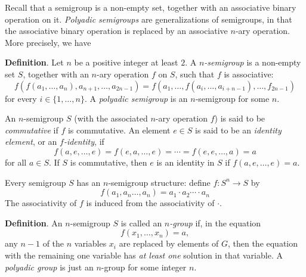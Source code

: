 \documentclass[12pt]{article}
\begin{document}
Recall that a semigroup is a non-empty set, together with an associative binary operation on it.  \emph{Polyadic semigroups} are generalizations of semigroups, in that the associative binary operation is replaced by an associative $n$-ary operation.  More precisely, we have

\textbf{Definition}.  Let $n$ be a positive integer at least $2$.  A \emph{$n$-semigroup} is a non-empty set $S$, together with an $n$-ary operation $f$ on $S$, such that $f$ is associative:
$$f(f(a_1,\ldots, a_n),a_{n+1},\ldots, a_{2n-1})=f(a_1,\ldots, f(a_i,\ldots, a_{i+n-1}), \ldots, f_{2n-1})$$
for every $i\in \lbrace 1,\ldots, n\rbrace$.  A \emph{polyadic semigroup} is an $n$-semigroup for some $n$.

An $n$-semigroup $S$ (with the associated $n$-ary operation $f$) is said to be \emph{commutative} if $f$ is commutative.  An element $e\in S$ is said to be an \emph{identity element}, or an \emph{$f$-identity}, if $$f(a, e, \ldots, e)=f(e,a,\ldots,e)=\cdots = f(e,e,\ldots,a) = a$$ for all $a\in S$.  If $S$ is commutative, then $e$ is an identity in $S$ if $f(a,e,\ldots,e)=a$.

Every semigroup $S$ has an $n$-semigroup structure: define $f:S^n\to S$ by 
\begin{equation}
f(a_1,a_n\ldots,a_n)=a_1 \cdot a_2 \cdots \cdot a_n
\end{equation}
The associativity of $f$ is induced from the associativity of $\cdot$. 

\textbf{Definition}.  An $n$-semigroup $S$ is called an \emph{$n$-group} if, in the equation 
\begin{equation}
f(x_1,\ldots, x_n)=a,
\end{equation}
any $n-1$ of the $n$ variables $x_i$ are replaced by elements of $G$, then the equation with the remaining one variable has \emph{at least one} solution in that variable.  A \emph{polyadic group} is just an $n$-group for some integer $n$.
\end{document}
